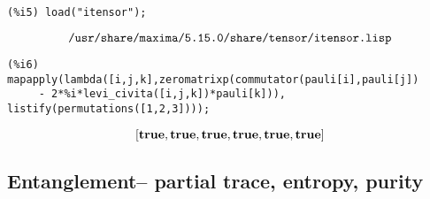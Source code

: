 \documentclass[leqno]{article}
\begin{document}
\begin{verbatim}
(%i5) load("itensor");
\end{verbatim}
\begin{dmath}[number={\%o5}]
 \verb|/usr/share/maxima/5.15.0/share/tensor/itensor.lisp|\end{dmath}
\begin{verbatim}
(%i6) mapapply(lambda([i,j,k],zeromatrixp(commutator(pauli[i],pauli[j]) 
     - 2*%i*levi_civita([i,j,k])*pauli[k])), listify(permutations([1,2,3])));
\end{verbatim}
\begin{dmath}[number={\%o6}]
 \left[ \mathbf{true},\linebreak[0]\mathbf{true},\linebreak[0]\mathbf{true},\linebreak[0]\mathbf{true},\linebreak[0]\mathbf{true},\linebreak[0]\mathbf{true} \right] \end{dmath}

\subsection{Entanglement-- partial trace, entropy, purity}
\end{document}
